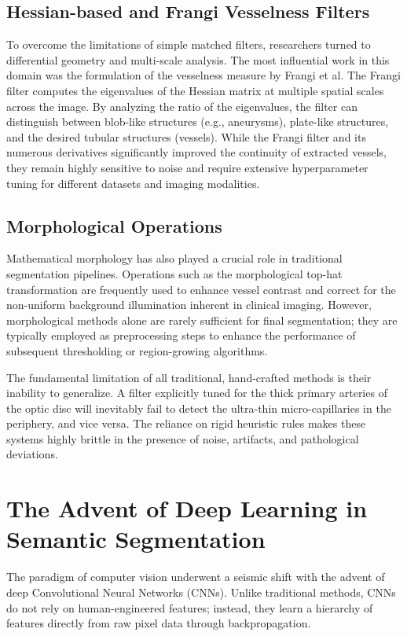 \subsection{Hessian-based and Frangi Vesselness Filters}
To overcome the limitations of simple matched filters, researchers turned to differential geometry and multi-scale analysis. The most influential work in this domain was the formulation of the vesselness measure by Frangi et al. The Frangi filter computes the eigenvalues of the Hessian matrix at multiple spatial scales across the image. By analyzing the ratio of the eigenvalues, the filter can distinguish between blob-like structures (e.g., aneurysms), plate-like structures, and the desired tubular structures (vessels). While the Frangi filter and its numerous derivatives significantly improved the continuity of extracted vessels, they remain highly sensitive to noise and require extensive hyperparameter tuning for different datasets and imaging modalities.

\subsection{Morphological Operations}
Mathematical morphology has also played a crucial role in traditional segmentation pipelines. Operations such as the morphological top-hat transformation are frequently used to enhance vessel contrast and correct for the non-uniform background illumination inherent in clinical imaging. However, morphological methods alone are rarely sufficient for final segmentation; they are typically employed as preprocessing steps to enhance the performance of subsequent thresholding or region-growing algorithms.

The fundamental limitation of all traditional, hand-crafted methods is their inability to generalize. A filter explicitly tuned for the thick primary arteries of the optic disc will inevitably fail to detect the ultra-thin micro-capillaries in the periphery, and vice versa. The reliance on rigid heuristic rules makes these systems highly brittle in the presence of noise, artifacts, and pathological deviations.

\section{The Advent of Deep Learning in Semantic Segmentation}
The paradigm of computer vision underwent a seismic shift with the advent of deep Convolutional Neural Networks (CNNs). Unlike traditional methods, CNNs do not rely on human-engineered features; instead, they learn a hierarchy of features directly from raw pixel data through backpropagation.

